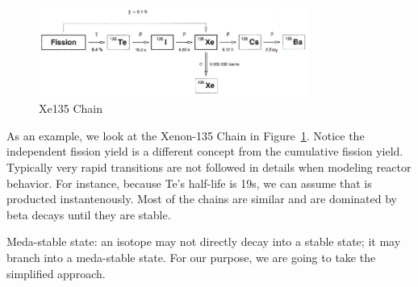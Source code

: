 \documentclass{school-22.211-notes}
\begin{document}
\begin{figure}
  \centering
  \includegraphics[width=3.5in]{images/dfs/Xe135.png}
  \caption{Xe135 Chain} \label{Xe135} 
\end{figure}

As an example, we look at the Xenon-135 Chain in Figure~\ref{Xe135}. Notice the independent fission yield is a different concept from the cumulative fission yield. Typically very rapid transitions are not followed in details when modeling reactor behavior. For instance, because Te's half-life is 19s, we can assume that  is producted instantenously. Most of the chains are similar and are dominated by beta decays until they are stable. 

Meda-stable state: an isotope may not directly decay into a stable state; it may branch into a meda-stable state. For our purpose, we are going to take the simplified approach.
\end{document}

